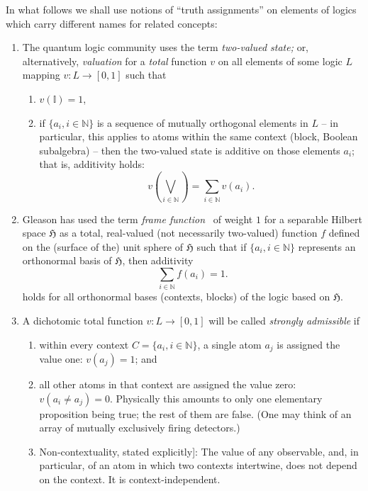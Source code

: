 In what follows we shall use notions of ``truth assignments'' on elements of logics which carry different names for related concepts:
\begin{enumerate}
\item
The quantum logic community uses the term {\em two-valued state;} or, alternatively, {\em valuation}
for a {\em total} function $v$ on all elements of some logic $L$  mapping
$v: L \rightarrow [0,1]$  such that~\cite[Definition~2.1.1, p.~20]{pulmannova-91}
\begin{enumerate}
\item
$v (\mathbb{I}) = 1$,
\item
if $\{ a_i, i \in \mathbb{N}\}$ is a sequence of mutually orthogonal elements in $L$ -- in particular,  this applies to
atoms within the same context (block, Boolean subalgebra) --
then the two-valued state is additive on those elements $a_i$;  that is, additivity holds:
\begin{equation}
v\left( \bigvee_{i \in \mathbb{N}} \right) = \sum_{i \in \mathbb{N}} v(a_i).
\label{2017-ch-pu-qlff}
\end{equation}
\end{enumerate}

\item
Gleason has used the term {\em frame function}~\cite[p.~886]{Gleason}
of weight $1$ for a separable Hilbert space $\mathfrak{H}$ as a
total,
real-valued (not necessarily two-valued) function $f$ defined on the (surface of the)
unit sphere of $\mathfrak{H}$  such that if
$\{ a_i, i \in \mathbb{N}\}$ represents an orthonormal basis  of  $\mathfrak{H}$, then  additivity
\begin{equation}
 \sum_{i \in \mathbb{N}} f(a_i) = 1.
\label{2017-ch-pu-glff}
\end{equation}
holds for all orthonormal bases
(contexts, blocks) of the logic based on  $\mathfrak{H}$.


\item
A dichotomic total function $v: L \rightarrow [0,1]$  will be called   {\em strongly admissible}
if
\begin{enumerate}
\item      within every context $C = \{ a_i, i \in \mathbb{N}\}$, a single atom $a_j$ is assigned the value one: $v(a_j)=1$;
and
\item    all other atoms in that context are assigned the value zero: $v(a_i\neq a_j )=0$.
Physically this amounts to only one elementary proposition being true; the rest of them are false.
(One may think of an array of mutually exclusively firing detectors.)
\item     Non-contextuality, stated explicitly]:
The value of any observable, and, in particular, of an atom in which two contexts intertwine, does not depend on the context. It is context-independent.
\end{enumerate}


\end{enumerate}

